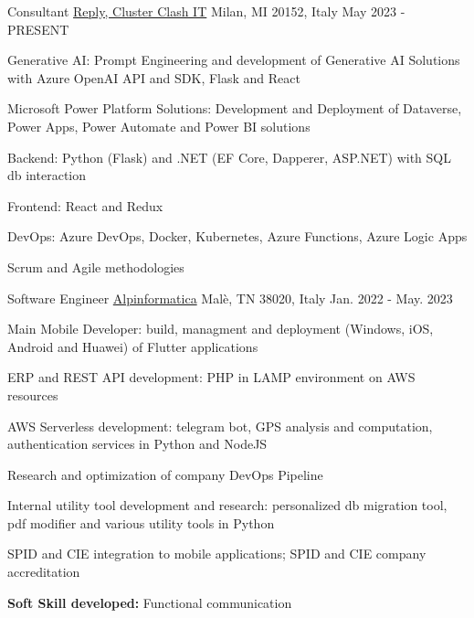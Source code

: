 

\begin{cventries}

  \cventry
    {Consultant} %
    {\href{www.reply.com/}{Reply, Cluster Clash IT}} %
    {Milan, MI 20152, Italy} %
    {May 2023 - PRESENT} %
    {
       \begin{cvitems} %
        \item {Generative AI: Prompt Engineering and development of Generative AI Solutions with Azure OpenAI API and SDK, Flask and React}
        \item {Microsoft Power Platform Solutions: Development and Deployment of Dataverse, Power Apps, Power Automate and Power BI solutions}
        \item {Backend: Python (Flask) and .NET (EF Core, Dapperer, ASP.NET) with SQL db interaction}
        \item {Frontend: React and Redux}
        \item {DevOps: Azure DevOps, Docker, Kubernetes, Azure Functions, Azure Logic Apps}
        \item {Scrum and Agile methodologies}
       \end{cvitems}
    }

  \cventry
    {Software Engineer} %
    {\href{https://www.alpinformatica.com/}{Alpinformatica}} %
    {Malè, TN 38020, Italy} %
    {Jan. 2022 - May. 2023} %
    {
      \begin{cvitems} %
        \item {Main Mobile Developer: build, managment and deployment (Windows, iOS, Android and Huawei) of Flutter applications}
        \item {ERP and REST API development: PHP in LAMP environment on AWS resources}
        \item {AWS Serverless development: telegram bot, GPS analysis and computation, authentication services in Python and NodeJS}
        \item {Research and optimization of company DevOps Pipeline}
        \item {Internal utility tool development and research: personalized db migration tool, pdf modifier and various utility tools in Python}
        \item {SPID and CIE integration to mobile applications; SPID and CIE company accreditation}
        \item {\textbf{Soft Skill developed:} Functional communication}
      \end{cvitems}
    }


\end{cventries}
